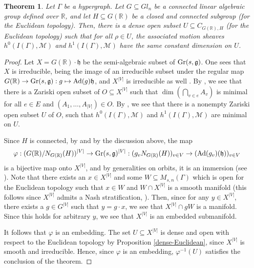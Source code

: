 \documentclass{article}
\newtheorem{theorem}{Theorem}[section]
\theoremstyle{definition}
\theoremstyle{remark}
\begin{document}
\begin{theorem}\label{thm: Generic}
    Let $\Gamma$ be a hypergraph. Let $G\subseteq Gl_n$ be a connected linear algebraic group defined over $\mathbb{R}$, and let $H\subseteq G(\mathbb{R})$ be a closed and connected subgroup (for the Euclidean topology). Then, there is a dense open subset $U \subseteq C_{G(\mathbb{R}),H}$ (for the Euclidean topology) such that for all $\rho\in U$, the associated motion sheaves $h^{0}(I(\Gamma), \mathcal{M})$ and $h^{1}(I(\Gamma), \mathcal{M})$ have the same constant dimension on $U$. 
\end{theorem}
\begin{proof}
     Let $X = G(\mathbb{R}) \cdot \mathfrak{h}$ be the semi-algebraic subset of $\textup{Gr}(s,\mathfrak{g})$. One sees that $X$ is irreducible, being the image of an irreducible subset under the regular map $G(\mathbb{R})\rightarrow \textup{Gr}(s,\mathfrak{g}): g \mapsto \textup{Ad}(g)\mathfrak{h}$, and $X^{|V|}$ is irreducible as well \cite[Theorem 2.8.3.(iii)]{Bochnak1998}. 
    By , we see that there is a Zariski open subset of $O\subseteq X^{|V|}$ such that $\dim(\bigcap_{v\in e} A_v)$ is minimal for all $e\in E$ and $(A_1, \dots, A_{|V|})\in O$. By , we see that there is a nonempty Zariski open subset $U$ of $O$, such that $h^{0}(I(\Gamma), \mathcal{M})$ and $h^{1}(I(\Gamma), \mathcal{M})$ are minimal on $U$. 
    
    Since $H$ is connected, by  and by the discussion above,  the map $$\varphi: (G(\mathbb{R})/N_{G(\mathbb{R})}(H))^{|V|} \rightarrow \textup{Gr}(s, \mathfrak{g})^{|V|}: (g_{v}N_{G(\mathbb{R})}(H))_{v\in V} \rightarrow (\textup{Ad}(g_{v})(\mathfrak{h}))_{v\in V}$$
    is a bijective map onto $X^{|V|}$, and by generalities on orbits, it is an immersion (see \cite[Theorem 3.29]{Kirillov}). Note that there exists an $x\in X^{|V|}$ and some $W\subseteq M_{s,n}(\Gamma)$ which is open for the Euclidean topology such that $x\in W$ and $W\cap X^{|V|}$ is a smooth manifold (this follows since $X^{|V|}$ admits a Nash stratification, \cite[Definition 9.1.7, Proposition 9.1.8]{Bochnak1998}). Then, since for any $y\in X^{|V|}$, there exists a $g\in G^{|V|}$ such that $y = g \cdot x$, we see that $X^{|V|} \cap g W$ is a manifold. Since this holds for arbitrary $y$, we see that $X^{|V|}$ is an embedded submanifold. 
    
    It follows that $\varphi$ is an embedding. The set $U\subseteq X^{|V|}$ is dense and open with respect to the Euclidean topology by Proposition \ref{dense-Euclidean}, since $X^{|V|}$ is smooth and irreducible. Hence, since $\varphi$ is an embedding, $\varphi^{-1}(U)$ satisfies the conclusion of the theorem. 
\end{proof}
\end{document}
